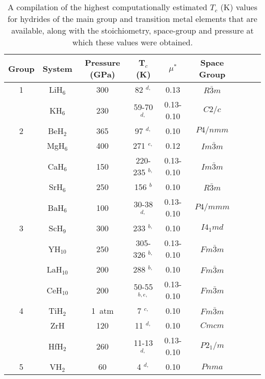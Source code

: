 \documentclass[12pt,letterpaper,oneside]{article}
\begin{document}
\begin{longtable}{ccccccccc}
\caption{A compilation of the highest computationally estimated $T_c$ (K) values for hydrides of the main group and transition metal elements that are available, along with the stoichiometry, space-group and pressure at which these values were obtained.} \\
\hline
Group & System       & Pressure (GPa) & T$_c$ (K) &  $\mu ^*$   & Space Group \\
\hline
1     & LiH$_6$      & 300            & 82 $^{d,}$ \cite{Xie:2014a}   & 0.13     &  $R\bar{3}m$ \\
      & KH$_6$       & 230            & 59-70 $^{d,}$ \cite{Zhou:2012a} & 0.13-0.10  &  $C2/c$ \\
\hline
2     & BeH$_2$      & 365            & 97 $^{d,}$ \cite{Yu:2014} & 0.10 &  $P4/nmm$ \\
      & MgH$_6$      & 400 & 271 $^{e,}$ \cite{Feng:2015a} & 0.12 & $Im\bar{3}m$   \\
      & CaH$_6$      & 150 & 220-235 $^{b,}$ \cite{Wang:2012} &0.13-0.10 & $Im\bar{3}m$   \\
      & SrH$_6$      & 250 & 156 $^{b}$ & 0.10 & $R\bar{3}m$   \\
      & BaH$_6$      & 100 & 30-38 $^{d,}$ \cite{Hooper:2012b} & 0.13-0.10 & $P4/mmm$   \\
\hline
3     & ScH$_9$      & 300 & 233 $^{b,}$ \cite{Zurek:2018b} & 0.10 &  $I4_{1}md$ \\
      & YH$_{10}$    & 250 &  305-326 $^{b,}$ \cite{Liu:2017-La-Y} & 0.13-0.10 &  $Fm\bar{3}m$  \\
      & LaH$_{10}$   & 200 & 288 $^{b,}$ \cite{Peng:Sc-2017} & 0.10 &  $Fm\bar{3}m$  \\
      & CeH$_{10}$   & 200 & 50-55 $^{b,e,}$ \cite{Peng:Sc-2017} & 0.13-0.10 &  $Fm\bar{3}m$  \\
\hline
4      & TiH$_2$     & 1~atm & 7 $^{c,}$ \cite{Shanavas:2016a} & 0.10 &  $Fm\bar{3}m$  \\
      & ZrH          & 120 & 11 $^{d,}$ \cite{Li:2017} & 0.10 &  $Cmcm$  \\
      & HfH$_2$      & 260 & 11-13 $^{d,}$ \cite{Liu:2015} & 0.13-0.10 &  $P2_{1}/m$  \\
\hline
5     & VH$_{2}$     & 60 & 4 $^{d,}$ \cite{Chen:2014} & 0.10 & $Pnma$ \\

\end{longtable}
\end{document}
